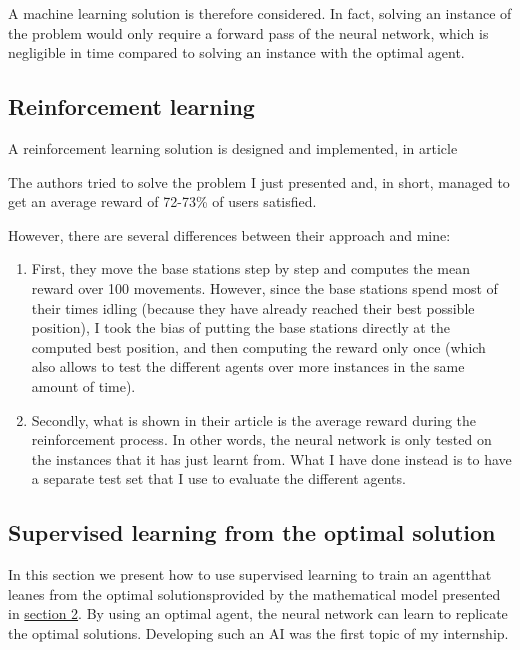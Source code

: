 \documentclass[letterpaper]{article}
\begin{document}
A machine learning solution is therefore considered.
In fact, solving an instance of the problem would only require a forward pass of the neural network, which is negligible in time compared to solving an instance with the optimal agent.

\subsection{Reinforcement learning}
\label{reinforcement}

A reinforcement learning solution is designed and implemented, in article\;\cite{main_article}

The authors tried to solve the problem I just presented and, in short, managed to get an average reward of 72-73\% of users satisfied.

However, there are several differences between their approach and mine:

\begin{enumerate}
    \item First, they move the base stations step by step and computes the mean reward over 100 movements.
          However, since the base stations spend most of their times idling (because they have already reached their best possible position),
          I took the bias of putting the base stations directly at the computed best position, and then computing the reward only once (which also allows to test the different agents over more instances in the same amount of time).
    \item Secondly, what is shown in their article is the average reward during the reinforcement process.
        In other words, the neural network is only tested on the instances that it has just learnt from.
        What I have done instead is to have a separate test set that I use to evaluate the different agents.
\end{enumerate}

\subsection{Supervised learning from the optimal solution}

In this section we present how to use supervised learning to train an agentthat leanes from the optimal solutionsprovided by the mathematical model
presented in \hyperref[optimization]{section 2}.
By using an optimal agent, the neural network can learn to replicate the optimal solutions.
Developing such an AI was the first topic of my internship.
\end{document}
